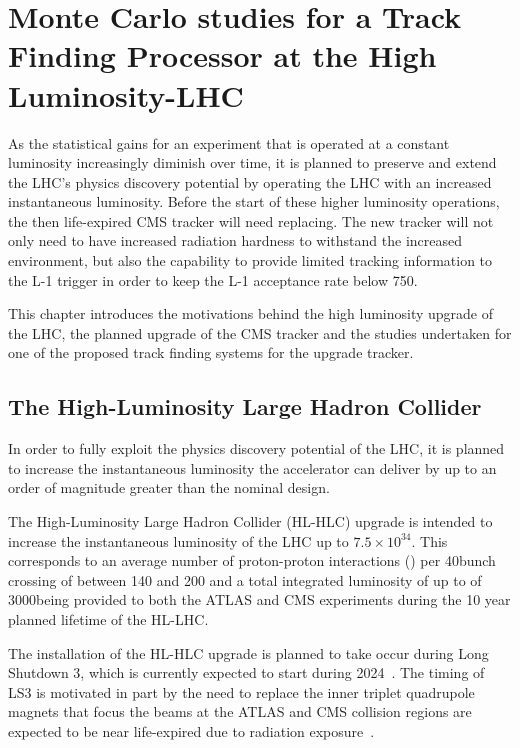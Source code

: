 \chapter{Monte Carlo studies for a Track Finding Processor at the High Luminosity-LHC}\label{chapter:tk-upgrade}
As the statistical gains for an experiment that is operated at a constant luminosity increasingly diminish over time, it is planned to preserve and extend the LHC's physics discovery potential by operating the LHC with an increased instantaneous luminosity.
Before the start of these higher luminosity operations, the then life-expired CMS tracker will need replacing.
The new tracker will not only need to have increased radiation hardness to withstand the increased \PU environment, but also the capability to provide limited tracking information to the L-1 trigger in order to keep the L-1 acceptance rate below 750\kHz.

This chapter introduces the motivations behind the high luminosity upgrade of the LHC, the planned upgrade of the CMS tracker and the studies undertaken for one of the proposed track finding systems for the upgrade tracker.

\section{The High-Luminosity Large Hadron Collider} \label{sec:hl-lhc}
In order to fully exploit the physics discovery potential of the LHC, it is planned to increase the instantaneous luminosity the accelerator can deliver by up to an order of magnitude greater than the nominal design.

The High-Luminosity Large Hadron Collider (HL-HLC) upgrade is intended to increase the instantaneous luminosity of the LHC up  to $7.5 \times {10}^{34}$\percms.
This corresponds to an average number of proton-proton interactions (\PU) per 40\MHz bunch crossing of between 140 and 200 and a total integrated luminosity of up to of 3000\fbinv being provided to both the ATLAS and CMS experiments during the 10 year planned lifetime of the HL-LHC.

The installation of the HL-HLC upgrade is planned to take occur during Long Shutdown 3, which is currently expected to start during 2024~\cite{ApollinariG.:2017ojx}. 
The timing of LS3 is motivated in part by the need to replace the inner triplet quadrupole magnets that focus the beams at the ATLAS and CMS collision regions are expected to be near life-expired due to radiation exposure~\cite{hl-lhc-prelim-design-report,CMSCollaboration:2015zni}.

